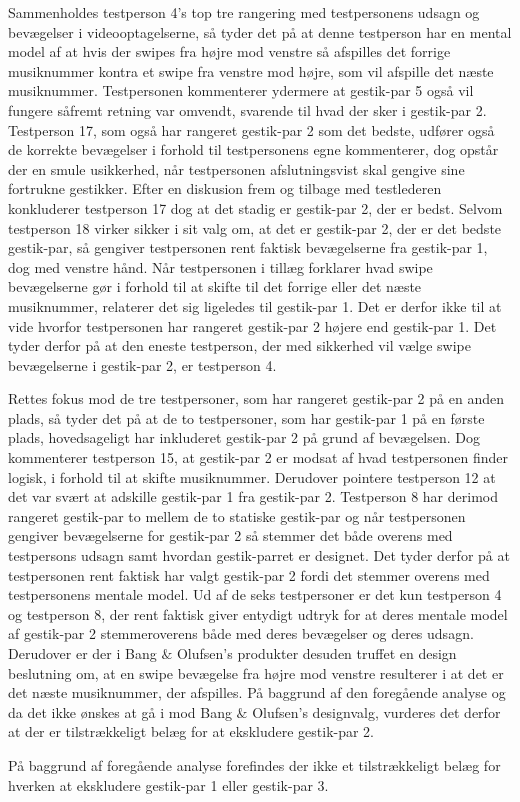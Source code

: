 Sammenholdes testperson 4's top tre rangering med testpersonens udsagn og bevægelser i videooptagelserne, så tyder det på at denne testperson har en mental model af at hvis der swipes fra højre mod venstre så afspilles det forrige musiknummer kontra et swipe fra venstre mod højre, som vil afspille det næste musiknummer. Testpersonen kommenterer ydermere at gestik-par 5 også vil fungere såfremt retning var omvendt, svarende til hvad der sker i gestik-par 2. Testperson 17, som også har rangeret gestik-par 2 som det bedste, udfører også de korrekte bevægelser i forhold til testpersonens egne kommenterer, dog opstår der en smule usikkerhed, når testpersonen afslutningsvist skal gengive sine fortrukne gestikker. Efter en diskusion frem og tilbage med testlederen konkluderer testperson 17 dog at det stadig er gestik-par 2, der er bedst. Selvom testperson 18 virker sikker i sit valg om, at det er gestik-par 2, der er det bedste gestik-par, så gengiver testpersonen rent faktisk bevægelserne fra gestik-par 1, dog med venstre hånd. Når testpersonen i tillæg forklarer hvad swipe bevægelserne gør i forhold til at skifte til det forrige eller det næste musiknummer, relaterer det sig ligeledes til gestik-par 1. Det er derfor ikke til at vide hvorfor testpersonen har rangeret gestik-par 2 højere end gestik-par 1. Det tyder derfor på at den eneste testperson, der med sikkerhed vil vælge swipe bevægelserne i gestik-par 2, er testperson 4. 

Rettes fokus mod de tre testpersoner, som har rangeret gestik-par 2 på en anden plads, så tyder det på at de to testpersoner, som har gestik-par 1 på en første plads, hovedsageligt har inkluderet gestik-par 2 på grund af bevægelsen. Dog kommenterer testperson 15, at gestik-par 2 er modsat af hvad testpersonen finder logisk, i forhold til at skifte musiknummer.  Derudover pointere testperson 12 at det var svært at adskille gestik-par 1 fra gestik-par 2. Testperson 8 har derimod rangeret gestik-par to mellem de to statiske gestik-par og når testpersonen gengiver bevægelserne for gestik-par 2 så stemmer det både overens med testpersons udsagn samt hvordan gestik-parret er designet. Det tyder derfor på at testpersonen rent faktisk har valgt gestik-par 2 fordi det stemmer overens med testpersonens mentale model.\blankline 
%
Ud af de seks testpersoner er det kun testperson 4 og testperson 8, der rent faktisk giver entydigt udtryk for at deres mentale model af gestik-par 2 stemmeroverens både med deres bevægelser og deres udsagn. Derudover er der i Bang $\&$ Olufsen's produkter desuden truffet en design beslutning om, at en swipe bevægelse fra højre mod venstre resulterer i at det er det næste musiknummer, der afspilles. På baggrund af den foregående analyse og da det ikke ønskes at gå i mod Bang $\&$ Olufsen's designvalg, vurderes det derfor at der er tilstrækkeligt belæg for at ekskludere gestik-par 2. 

På baggrund af foregående analyse forefindes der ikke et tilstrækkeligt belæg for hverken at ekskludere gestik-par 1 eller gestik-par 3. 

